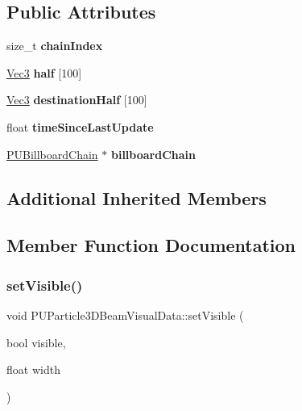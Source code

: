 \subsection*{Public Attributes}
\begin{DoxyCompactItemize}
\item 
\mbox{\label{classPUParticle3DBeamVisualData_ade39ee7474bf52be52e2bb75a7435dfa}} 
size\+\_\+t {\bfseries chain\+Index}
\item 
\mbox{\label{classPUParticle3DBeamVisualData_a824b80192e1e82b9910614c0d826a7ea}} 
\hyperlink{classVec3}{Vec3} {\bfseries half} \mbox{[}100\mbox{]}
\item 
\mbox{\label{classPUParticle3DBeamVisualData_a49681474f45f92b24e298c664f4daa6f}} 
\hyperlink{classVec3}{Vec3} {\bfseries destination\+Half} \mbox{[}100\mbox{]}
\item 
\mbox{\label{classPUParticle3DBeamVisualData_a68dfaba82e984467199eadc018d94214}} 
float {\bfseries time\+Since\+Last\+Update}
\item 
\mbox{\label{classPUParticle3DBeamVisualData_ac50c83aea25832f3cd42f860c5eb08c4}} 
\hyperlink{classPUBillboardChain}{P\+U\+Billboard\+Chain} $\ast$ {\bfseries billboard\+Chain}
\end{DoxyCompactItemize}
\subsection*{Additional Inherited Members}


\subsection{Member Function Documentation}
\mbox{\label{classPUParticle3DBeamVisualData_ac26dcb281e318cd880865290b373f88c}} 
\subsubsection{\texorpdfstring{set\+Visible()}{setVisible()}\hspace{0.1cm}{\footnotesize\ttfamily [1/2]}}
{\footnotesize\ttfamily void P\+U\+Particle3\+D\+Beam\+Visual\+Data\+::set\+Visible (\begin{DoxyParamCaption}\item[{bool}]{visible,  }\item[{float}]{width }\end{DoxyParamCaption})\hspace{0.3cm}{\ttfamily [inline]}}

